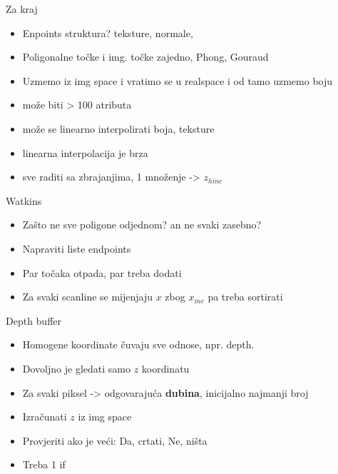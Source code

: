 \documentclass[9pt]{beamer}
\begin{document}
\begin{frame}{Za kraj}
	\begin{itemize}
		\item Enpoints struktura? teksture, normale, 
		\item Poligonalne točke i img. točke zajedno, Phong, Gouraud
		\item Uzmemo iz img space i vratimo se u realspace i od tamo uzmemo boju
		\item može biti > 100 atributa
		\item može se linearno interpolirati boja, teksture
		\item linearna interpolacija je brza
		\item sve raditi sa zbrajanjima, 1 množenje -> $z_{hinc}$
	\end{itemize}
\end{frame}

\begin{frame}{Watkins}
	\begin{itemize}
		\item Zašto ne sve poligone odjednom? an ne svaki zasebno?
		\item Napraviti liste endpoints
		\item Par točaka otpada, par treba dodati
		\item Za svaki scanline se mijenjaju $x$ zbog $x_{inc}$ pa treba sortirati
	\end{itemize}
\end{frame}

\begin{frame}{Depth buffer}
	\begin{itemize}
		\item Homogene koordinate čuvaju sve odnose, npr. depth.
		\item Dovoljno je gledati samo $z$ koordinatu
		\item Za svaki piksel -> odgovarajuća \textbf{dubina}, inicijalno najmanji broj
		\item Izračunati $z$ iz img space
		\item Provjeriti ako je veći: Da, crtati, Ne, ništa
		\item Treba 1 if
	\end{itemize}
\end{frame}
\end{document}
